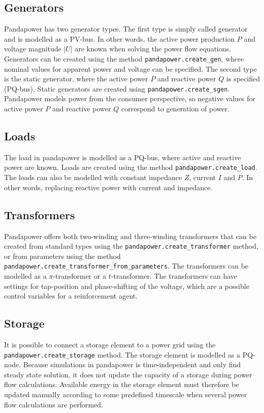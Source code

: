 \documentclass[class=book, crop=false]{standalone}
\begin{document}
\subsection*{Generators}
Pandapower has two generator types. The first type is simply called generator and is modelled as a PV-bus. In other words, the active power production $P$ and voltage magnitude $|U|$ are known when solving the power flow equations. Generators can be created using the method \texttt{pandapower.create\_gen}, where nominal values for apparent power and voltage can be specified. The second type is the static generator, where the active power $P$ and reactive power $Q$ is specified (PQ-bus). Static generators are created using \texttt{pandapower.create\_sgen}. Pandapower models power from the consumer perspective, so negative values for active power $P$ and reactive power $Q$ correspond to generation of power.

\subsection*{Loads}
The load in pandapower is modelled as a PQ-bus, where active and reactive power are known. Loads are created using the method \texttt{pandapower.create\_load}. The loads can also be modelled with constant impedance $Z$, current $I$ and $P$. In other words, replacing reactive power with current and impedance.

\subsection*{Transformers}
Pandapower offers both two-winding and three-winding transformers that can be created from standard types using the \texttt{pandapower.create\_transformer} method, or from parameters using the method
\texttt{pandapower.create\_transformer\_from\_parameters}. The transformers can be modelled as a $\pi$-transformer or a $t$-transformer. The transformers can have settings for tap-position and phase-shifting of the voltage, which are a possible control variables for a reinforcement agent.  

\subsection*{Storage}
It is possible to connect a storage element to a power grid using the \texttt{pandapower.create\_storage} method. The storage element is modelled as a PQ-node. Because simulations in pandapower is time-independent and only find steady state solution, it does not update the capacity of a storage during power flow calculations. Available energy in the storage element must therefore be updated manually according to some predefined timescale when several power flow calculations are performed.  
\end{document}
